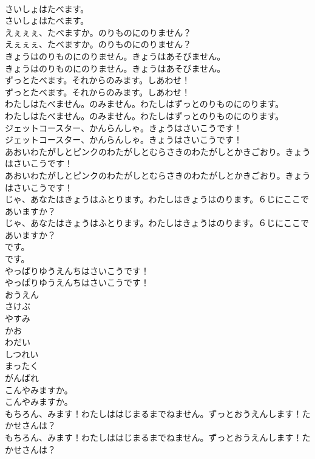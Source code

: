 \documentclass[8pt]{extreport}
\begin{document}
\begin{CJK}{UTF8}{min}
\\	さいしょはたべます。	
\\	さいしょはたべます。 
\\	えぇぇぇ、たべますか。のりものにのりません？	
\\	えぇぇぇ、たべますか。のりものにのりません？ 
\\	きょうはのりものにのりません。きょうはあそびません。	
\\	きょうはのりものにのりません。きょうはあそびません。 
\\	ずっとたべます。それからのみます。しあわせ！	
\\	ずっとたべます。それからのみます。しあわせ！ 
\\	わたしはたべません。のみません。わたしはずっとのりものにのります。	
\\	わたしはたべません。のみません。わたしはずっとのりものにのります。 
\\	ジェットコースター、かんらんしゃ。きょうはさいこうです！	
\\	ジェットコースター、かんらんしゃ。きょうはさいこうです！ 
\\	あおいわたがしとピンクのわたがしとむらさきのわたがしとかきごおり。きょうはさいこうです！	
\\	あおいわたがしとピンクのわたがしとむらさきのわたがしとかきごおり。きょうはさいこうです！ 
\\	じゃ、あなたはきょうはふとります。わたしはきょうはのります。６じにここであいますか？	
\\	じゃ、あなたはきょうはふとります。わたしはきょうはのります。６じにここであいますか？ 
\\	です。	
\\	です。 
\\	やっぱりゆうえんちはさいこうです！	
\\	やっぱりゆうえんちはさいこうです！ 
\\	おうえん
\\	さけぶ
\\	やすみ
\\	かお
\\	わだい
\\	しつれい
\\	まったく
\\	がんばれ
\\	こんやみますか。	
\\	こんやみますか。 
\\	もちろん、みます！わたしははじまるまでねません。ずっとおうえんします！たかせさんは？	
\\	もちろん、みます！わたしははじまるまでねません。ずっとおうえんします！たかせさんは？ 

\end{CJK}
\end{document}
